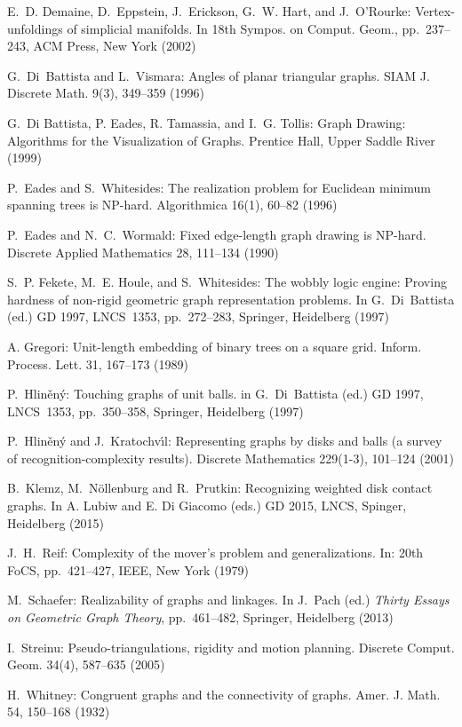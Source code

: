 \documentclass{article}
\theoremstyle{plain}%
\begin{document}
\begin{thebibliography}{99}
E.~D. Demaine, D.~Eppstein, J.~Erickson, G.~W. Hart, and J.~O'Rourke:
Vertex-unfoldings of simplicial manifolds.
In 18th Sympos. on Comput. Geom., pp.~237--243, ACM Press, New York (2002)

G.~Di~Battista and L.~Vismara:
Angles of planar triangular graphs.
SIAM J. Discrete Math. 9(3), 349--359 (1996)

G.~Di Battista, P. Eades, R. Tamassia, and I.~G. Tollis:
Graph Drawing: Algorithms for the Visualization of Graphs.
Prentice Hall, Upper Saddle River (1999)

P.~Eades and S.~Whitesides:
The realization problem for Euclidean minimum spanning trees is NP-hard.
Algorithmica  16(1), 60--82 (1996)

P.~Eades and N.~C.~Wormald: 
Fixed edge-length graph drawing is NP-hard.
Discrete Applied Mathematics 28, 111--134  (1990)

S.~P. Fekete, M.~E. Houle, and S.~Whitesides:
The wobbly logic engine: Proving hardness of non-rigid geometric graph representation problems.
In G.~Di~Battista (ed.) GD 1997, LNCS~1353, pp.~272--283, Springer, Heidelberg (1997)

A. Gregori:
Unit-length embedding of binary trees on a square grid.
Inform. Process. Lett. 31, 167--173 (1989)

P.~Hlin\v{e}n\'y:
Touching graphs of unit balls.
in G.~Di~Battista (ed.) GD 1997, LNCS~1353, pp.~350--358, Springer, Heidelberg (1997)

P.~Hlin\v{e}n\'y and J.~Kratochv\'{\i}l:
Representing graphs by disks and balls (a survey of recognition-complexity results).
Discrete Mathematics 229(1-3), 101--124 (2001)

B.~Klemz, M.~N\"ollenburg and R.~Prutkin:
Recognizing weighted disk contact graphs.
In A. Lubiw and E. Di Giacomo (eds.) GD 2015, LNCS, Spinger, Heidelberg (2015)

 J.~H.~Reif:
Complexity of the mover's problem and generalizations.
In: 20th FoCS, pp.~421--427, IEEE, New York (1979)

M.~Schaefer: 
Realizability of graphs and linkages.
In J.~Pach (ed.) \emph{Thirty Essays on Geometric Graph Theory}, pp.~461--482, Springer, Heidelberg (2013)

I.~Streinu:
Pseudo-triangulations, rigidity and motion planning.
Discrete Comput. Geom. 34(4), 587--635  (2005)

H.~Whitney:
Congruent graphs and the connectivity of graphs.
Amer. J. Math. 54, 150--168 (1932)

\end{thebibliography}
\end{document}
